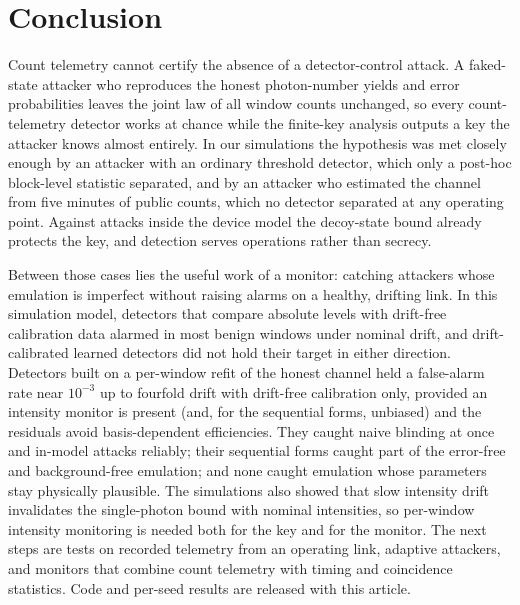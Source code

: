 \section{Conclusion}

Count telemetry cannot certify the absence of a detector-control attack. A faked-state attacker who reproduces the honest photon-number yields and error probabilities leaves the joint law of all window counts unchanged, so every count-telemetry detector works at chance while the finite-key analysis outputs a key the attacker knows almost entirely. In our simulations the hypothesis was met closely enough by an attacker with an ordinary threshold detector, which only a post-hoc block-level statistic separated, and by an attacker who estimated the channel from five minutes of public counts, which no detector separated at any operating point. Against attacks inside the device model the decoy-state bound already protects the key, and detection serves operations rather than secrecy.

Between those cases lies the useful work of a monitor: catching attackers whose emulation is imperfect without raising alarms on a healthy, drifting link. In this simulation model, detectors that compare absolute levels with drift-free calibration data alarmed in most benign windows under nominal drift, and drift-calibrated learned detectors did not hold their target in either direction. Detectors built on a per-window refit of the honest channel held a false-alarm rate near $10^{-3}$ up to fourfold drift with drift-free calibration only, provided an intensity monitor is present (and, for the sequential forms, unbiased) and the residuals avoid basis-dependent efficiencies. They caught naive blinding at once and in-model attacks reliably; their sequential forms caught part of the error-free and background-free emulation; and none caught emulation whose parameters stay physically plausible. The simulations also showed that slow intensity drift invalidates the single-photon bound with nominal intensities, so per-window intensity monitoring is needed both for the key and for the monitor. The next steps are tests on recorded telemetry from an operating link, adaptive attackers, and monitors that combine count telemetry with timing and coincidence statistics. Code and per-seed results are released with this article.
